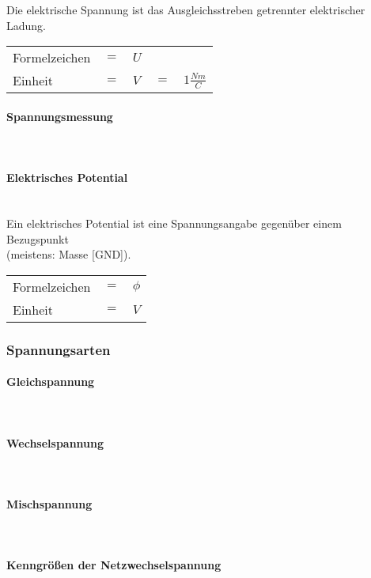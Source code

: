 \noindent Die elektrische Spannung ist das Ausgleichsstreben getrennter elektrischer Ladung.

\begin{tabular}{lllll}
Formelzeichen	& $=$ & $U$ & & \\
Einheit			& $=$ & $V$ & $=$ & $1\frac{Nm}{C}$ \\
\end{tabular}	
		
		\paragraph{Spannungsmessung}~\\
		\paragraph{Elektrisches Potential}~\\
		
\noindent Ein elektrisches Potential ist eine Spannungsangabe gegenüber einem Bezugspunkt\\(meistens: Masse [GND]).

\begin{tabular}{lll}
Formelzeichen	& $=$ & $\phi$ \\
Einheit			& $=$ & $V$ \\
\end{tabular}	
		
	\subsubsection{Spannungsarten}
		\paragraph{Gleichspannung}~\\
		\paragraph{Wechselspannung}~\\
		\paragraph{Mischspannung}~\\
		\paragraph{Kenngrößen der Netzwechselspannung}~\\
		
